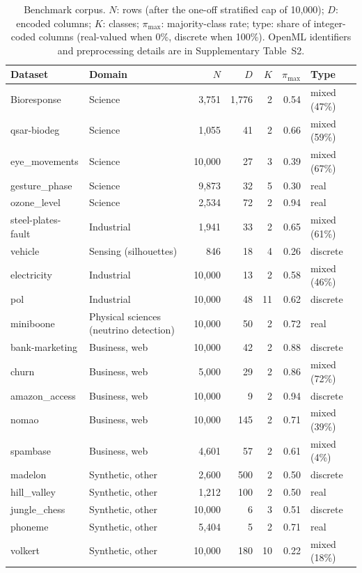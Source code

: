\documentclass[pdflatex,sn-mathphys]{sn-jnl}
\theoremstyle{thmstyleone}
\theoremstyle{thmstyletwo}
\theoremstyle{thmstylethree}
\begin{document}
\begin{table}[t]
\centering
\footnotesize
\caption{Benchmark corpus. $N$: rows (after the one-off stratified cap of 10{,}000); $D$: encoded columns; $K$: classes; $\pi_{\max}$: majority-class rate; type: share of integer-coded columns (real-valued when 0\%, discrete when 100\%). OpenML identifiers and preprocessing details are in Supplementary Table~S2.}
\label{tab:inventory}
\begin{tabular}{@{}llrrrrl@{}}
\toprule
Dataset & Domain & $N$ & $D$ & $K$ & $\pi_{\max}$ & Type \\
\midrule
Bioresponse & Science & 3{,}751 & 1{,}776 & 2 & 0.54 & mixed (47\%) \\
qsar-biodeg & Science & 1{,}055 & 41 & 2 & 0.66 & mixed (59\%) \\
eye\_movements & Science & 10{,}000 & 27 & 3 & 0.39 & mixed (67\%) \\
gesture\_phase & Science & 9{,}873 & 32 & 5 & 0.30 & real \\
ozone\_level & Science & 2{,}534 & 72 & 2 & 0.94 & real \\
steel-plates-fault & Industrial & 1{,}941 & 33 & 2 & 0.65 & mixed (61\%) \\
vehicle & Sensing (silhouettes) & 846 & 18 & 4 & 0.26 & discrete \\
electricity & Industrial & 10{,}000 & 13 & 2 & 0.58 & mixed (46\%) \\
pol & Industrial & 10{,}000 & 48 & 11 & 0.62 & discrete \\
miniboone & Physical sciences (neutrino detection) & 10{,}000 & 50 & 2 & 0.72 & real \\
bank-marketing & Business, web & 10{,}000 & 42 & 2 & 0.88 & discrete \\
churn & Business, web & 5{,}000 & 29 & 2 & 0.86 & mixed (72\%) \\
amazon\_access & Business, web & 10{,}000 & 9 & 2 & 0.94 & discrete \\
nomao & Business, web & 10{,}000 & 145 & 2 & 0.71 & mixed (39\%) \\
spambase & Business, web & 4{,}601 & 57 & 2 & 0.61 & mixed (4\%) \\
madelon & Synthetic, other & 2{,}600 & 500 & 2 & 0.50 & discrete \\
hill\_valley & Synthetic, other & 1{,}212 & 100 & 2 & 0.50 & real \\
jungle\_chess & Synthetic, other & 10{,}000 & 6 & 3 & 0.51 & discrete \\
phoneme & Synthetic, other & 5{,}404 & 5 & 2 & 0.71 & real \\
volkert & Synthetic, other & 10{,}000 & 180 & 10 & 0.22 & mixed (18\%) \\
\bottomrule
\end{tabular}
\end{table}
\end{document}
